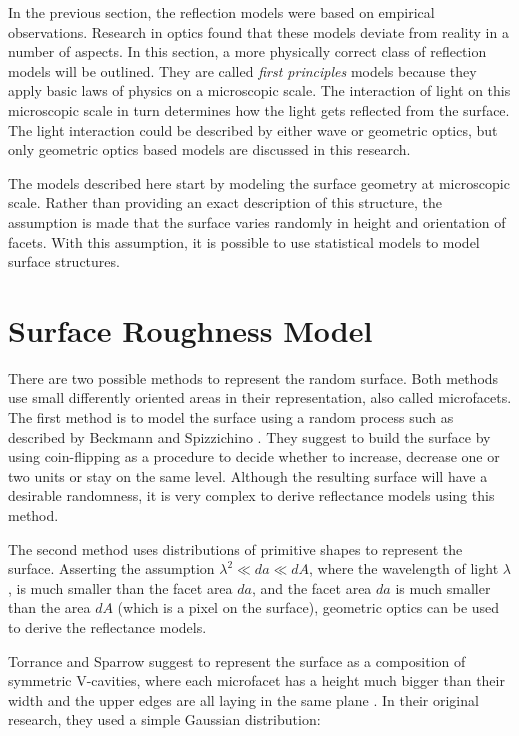 \hypertarget{Microfacet Models}{
}

\noindent In the previous section, the reflection models were based on empirical observations. Research in optics found that these models deviate from reality in a number of aspects. In this section, a more physically correct class of reflection models will be outlined. They are called {\it first principles} models because they apply basic laws of physics on a microscopic scale. The interaction of light on this microscopic scale in turn determines how the light gets reflected from the surface. The light interaction could be described by either wave or geometric optics, but only geometric optics based models are discussed in this research.

The models described here start by modeling the surface geometry at microscopic scale. Rather than providing an exact description of this structure, the assumption is made that the surface varies randomly in height and orientation of facets. With this assumption, it is possible to use statistical models to model surface structures.

\section{Surface Roughness Model}\label{sec:SRM}
There are two possible methods to represent the random surface. Both methods use small differently oriented areas in their representation, also called microfacets. The first method is to model the surface using a random process such as described by Beckmann and Spizzichino \cite{BeckmannSpizzichino}. They suggest to build the surface by using coin-flipping as a procedure to decide whether to increase, decrease one or two units or stay on the same level. Although the resulting surface will have a desirable randomness, it is very complex to derive reflectance models using this method. 

The second method uses distributions of primitive shapes to represent the surface. Asserting the assumption $\lambda^2 \ll da \ll dA$, where the wavelength of light $\lambda$, is much smaller than the facet area $da$, and the facet area $da$ is much smaller than the area $dA$ (which is a pixel on the surface), geometric optics can be used to derive the reflectance models. 

Torrance and Sparrow suggest to represent the surface as a composition of symmetric V-cavities, where each microfacet has a height much bigger than their width and the upper edges are all laying in the same plane \cite{TorranceSparrow}. In their original research, they used a simple Gaussian distribution:

